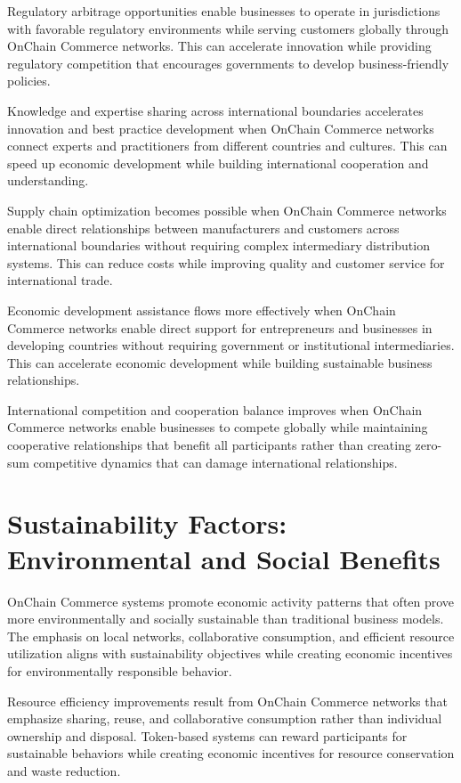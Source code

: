 \documentclass[
  Letterpaper,
]{scrbook}
\begin{document}
Regulatory arbitrage opportunities enable businesses to operate in
jurisdictions with favorable regulatory environments while serving
customers globally through OnChain Commerce networks. This can
accelerate innovation while providing regulatory competition that
encourages governments to develop business-friendly policies.

Knowledge and expertise sharing across international boundaries
accelerates innovation and best practice development when OnChain
Commerce networks connect experts and practitioners from different
countries and cultures. This can speed up economic development while
building international cooperation and understanding.

Supply chain optimization becomes possible when OnChain Commerce
networks enable direct relationships between manufacturers and customers
across international boundaries without requiring complex intermediary
distribution systems. This can reduce costs while improving quality and
customer service for international trade.

Economic development assistance flows more effectively when OnChain
Commerce networks enable direct support for entrepreneurs and businesses
in developing countries without requiring government or institutional
intermediaries. This can accelerate economic development while building
sustainable business relationships.

International competition and cooperation balance improves when OnChain
Commerce networks enable businesses to compete globally while
maintaining cooperative relationships that benefit all participants
rather than creating zero-sum competitive dynamics that can damage
international relationships.

\section{Sustainability Factors: Environmental and Social
Benefits}\label{sustainability-factors-environmental-and-social-benefits}

OnChain Commerce systems promote economic activity patterns that often
prove more environmentally and socially sustainable than traditional
business models. The emphasis on local networks, collaborative
consumption, and efficient resource utilization aligns with
sustainability objectives while creating economic incentives for
environmentally responsible behavior.

Resource efficiency improvements result from OnChain Commerce networks
that emphasize sharing, reuse, and collaborative consumption rather than
individual ownership and disposal. Token-based systems can reward
participants for sustainable behaviors while creating economic
incentives for resource conservation and waste reduction.
\end{document}

